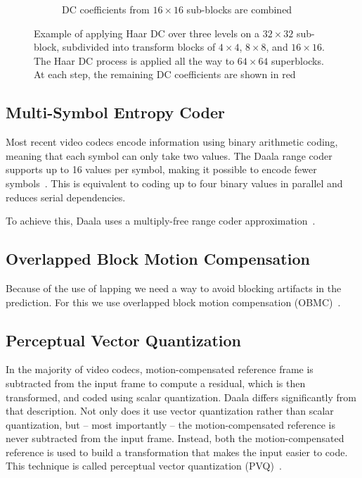 \documentclass[english,conference,10pt]{IEEEtran}
\begin{document}
\begin{figure}
\begin{subfigure}[t]{0.49\columnwidth}
		\caption{DC coefficients from $16\times 16$ sub-blocks are combined}
	\end{subfigure}
	\caption{Example of applying Haar DC over three levels on a $32\times 32$
		sub-block, subdivided into transform blocks of $4 \times 4$, $8 \times 8$,
		and $16 \times 16$. The Haar DC process is applied all the way to
		$64\times 64$ superblocks. At each step, the remaining DC coefficients
		are shown in red}
	\label{fig:haardc}
\end{figure}

\subsection{Multi-Symbol Entropy Coder}

Most recent video codecs encode information using binary arithmetic
coding, meaning that each symbol can only take two values. The Daala
range coder supports up to 16 values per symbol, making it possible
to encode fewer symbols~\cite{derfTools}. This is equivalent to
coding up to four binary values in parallel and reduces serial dependencies. 

To achieve this, Daala uses a multiply-free range coder approximation~\cite{stuiver1998piecewise}. 


\subsection{Overlapped Block Motion Compensation}

Because of the use of lapping we need a way to avoid blocking artifacts
in the prediction. For this we use overlapped block motion compensation
(OBMC)~\cite{OBMC}.


\subsection{Perceptual Vector Quantization}

In the majority of video codecs, motion-compensated reference frame
is subtracted from the input frame to compute a residual, which is
then transformed, and coded using scalar quantization. Daala differs
significantly from that description. Not only does it use vector quantization
rather than scalar quantization, but -- most importantly -- the motion-compensated
reference is never subtracted from the input frame. Instead, both
the motion-compensated reference is used to build a transformation
that makes the input easier to code. This technique is called perceptual
vector quantization (PVQ)~\cite{valin2015spie}.
\end{document}
